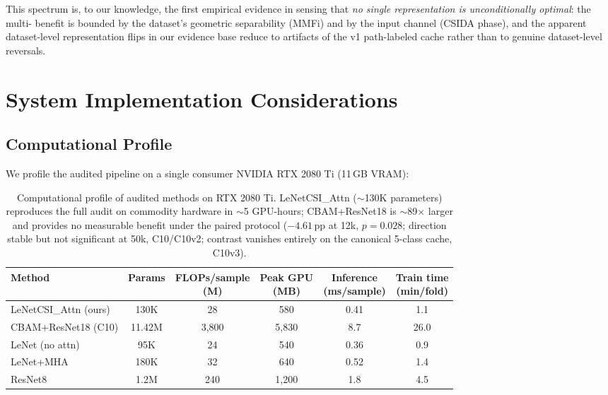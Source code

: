 \documentclass[journal,11pt]{IEEEtran}
\newcommand{\CSI}{\text{CSI}}
\newcommand{\Rx}{\text{Rx}}
\begin{document}
This spectrum is, to our knowledge, the first empirical evidence in \CSI{} sensing that \emph{no single representation is unconditionally optimal}: the multi-\Rx{} benefit is bounded by the dataset's geometric separability (MMFi) and by the input channel (CSIDA phase), and the apparent dataset-level representation flips in our evidence base reduce to artifacts of the v1 path-labeled cache rather than to genuine dataset-level reversals.

\section{System Implementation Considerations}
\label{sec:system}

\subsection{Computational Profile}
We profile the audited pipeline on a single consumer NVIDIA RTX 2080 Ti (11\,GB VRAM):

\begin{table}[!t]
    \centering
    \caption{Computational profile of audited methods on RTX 2080 Ti. LeNetCSI\_Attn ($\sim$130K parameters) reproduces the full audit on commodity hardware in $\sim$5 GPU-hours; CBAM+ResNet18 is $\sim$89$\times$ larger and provides no measurable benefit under the paired protocol ($-4.61$\,pp at 12k, $p = 0.028$; direction stable but not significant at 50k, C10/C10v2; contrast vanishes entirely on the canonical 5-class cache, C10v3).}
    \label{tab:profile}
    \setlength{\tabcolsep}{8pt}
    \footnotesize
    \begin{tabular}{@{}l c c c c c@{}}
    \toprule
    Method & Params & \makecell{FLOPs/sample\\(M)} & \makecell{Peak GPU\\(MB)} & \makecell{Inference\\(ms/sample)} & \makecell{Train time\\(min/fold)} \\
    \midrule
    LeNetCSI\_Attn (ours) & 130K  & 28    & 580   & 0.41 & 1.1 \\
    CBAM+ResNet18 (C10)   & 11.42M & 3{,}800 & 5{,}830 & 8.7 & 26.0 \\
    LeNet (no attn)       & 95K   & 24    & 540   & 0.36 & 0.9 \\
    LeNet+MHA             & 180K  & 32    & 640   & 0.52 & 1.4 \\
    ResNet8               & 1.2M  & 240   & 1{,}200 & 1.8 & 4.5 \\
    \bottomrule
    \end{tabular}
\end{table}
\end{document}
